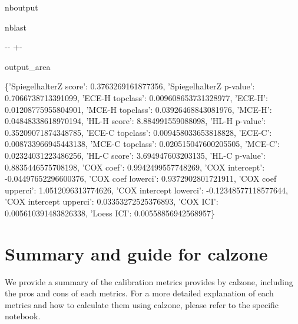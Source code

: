 \documentclass[letterpaper,10pt,english]{sphinxmanual}
\begin{document}
\begin{sphinxuseclass}{nboutput}
\begin{sphinxuseclass}{nblast}
{

\kern-\sphinxverbatimsmallskipamount\kern-\baselineskip
\kern+\FrameHeightAdjust\kern-\fboxrule
\vspace{\nbsphinxcodecellspacing}

\begin{sphinxuseclass}{output_area}
\begin{sphinxuseclass}{}


\begin{sphinxVerbatim}[commandchars=\\\{\}]
\llap{\color{nbsphinxout}[1]:\,\hspace{\fboxrule}\hspace{\fboxsep}}\{'SpiegelhalterZ score': 0.3763269161877356,
 'SpiegelhalterZ p-value': 0.7066738713391099,
 'ECE-H topclass': 0.009608653731328977,
 'ECE-H': 0.01208775955804901,
 'MCE-H topclass': 0.03926468843081976,
 'MCE-H': 0.04848338618970194,
 'HL-H score': 8.884991559088098,
 'HL-H p-value': 0.35209071874348785,
 'ECE-C topclass': 0.009458033653818828,
 'ECE-C': 0.008733966945443138,
 'MCE-C topclass': 0.020515047600205505,
 'MCE-C': 0.02324031223486256,
 'HL-C score': 3.694947603203135,
 'HL-C p-value': 0.8835446575708198,
 'COX coef': 0.9942499557748269,
 'COX intercept': -0.04497652296600376,
 'COX coef lowerci': 0.9372902801721911,
 'COX coef upperci': 1.0512096313774626,
 'COX intercept lowerci': -0.12348577118577644,
 'COX intercept upperci': 0.03353272525376893,
 'COX ICI': 0.005610391483826338,
 'Loess ICI': 0.00558856942568957\}
\end{sphinxVerbatim}



\end{sphinxuseclass}
\end{sphinxuseclass}
}

\end{sphinxuseclass}
\end{sphinxuseclass}
\sphinxstepscope


\chapter{Summary and guide for calzone}
\label{\detokenize{notebooks/metrics_summary:Summary-and-guide-for-calzone}}\label{\detokenize{notebooks/metrics_summary::doc}}
\sphinxAtStartPar
We provide a summary of the calibration metrics provides by calzone, including the pros and cons of each metrics. For a more detailed explanation of each metrics and how to calculate them using calzone, please refer to the specific notebook.
\end{document}
